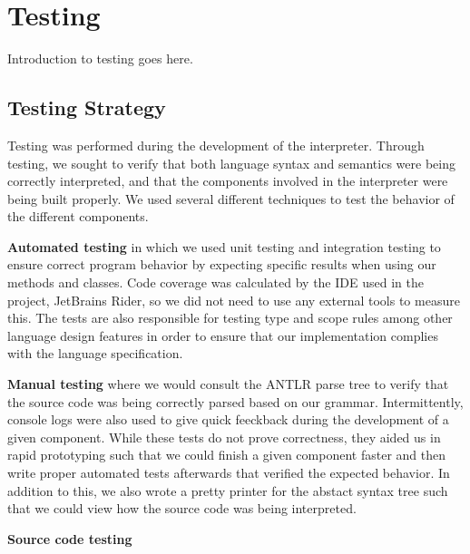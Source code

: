 \chapter{Testing}

Introduction to testing goes here.

\section{Testing Strategy}
Testing was performed during the development of the \dazel{} interpreter. 
Through testing, we sought to verify that both language syntax and semantics were being correctly interpreted, and that the components involved in the interpreter were being built properly.
We used several different techniques to test the behavior of the different components. 

\textbf{Automated testing} in which we used unit testing and integration testing to ensure correct program behavior by expecting specific results when using our methods and classes. 
Code coverage was calculated by the IDE used in the project, JetBrains Rider, so we did not need to use any external tools to measure this\cite{rider_test_coverage}.
The tests are also responsible for testing type and scope rules among other language design features in order to ensure that our implementation complies with the language specification.

\textbf{Manual testing} where we would consult the ANTLR parse tree to verify that the source code was being correctly parsed based on our grammar. 
Intermittently, console logs were also used to give quick feeckback during the development of a given component.
While these tests do not prove correctness, they aided us in rapid prototyping such that we could finish a given component faster and then write proper automated tests afterwards that verified the expected behavior.  
In addition to this, we also wrote a pretty printer for the abstact syntax tree such that we could view how the source code was being interpreted.

\textbf{Source code testing}

